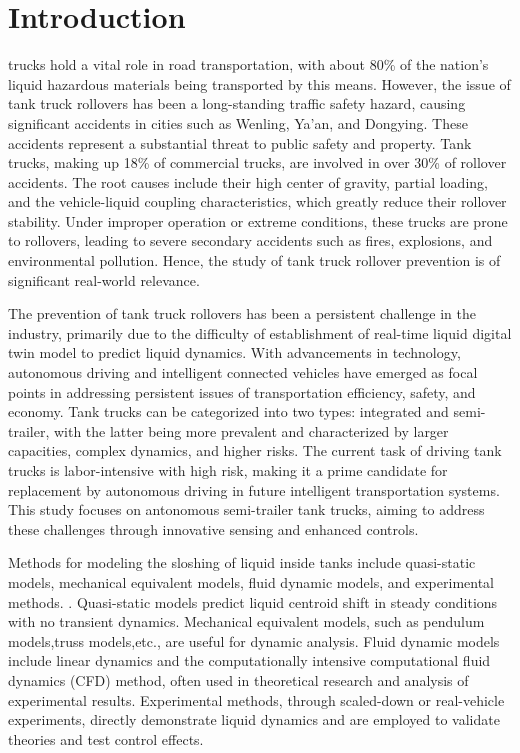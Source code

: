 \section{Introduction}
 trucks hold a vital role in road transportation, with about 80\% of the nation's liquid hazardous materials being transported by this means\cite{200Accidents}. However, the issue of tank truck rollovers has been a long-standing traffic safety hazard, causing significant accidents in cities such as Wenling, Ya'an, and Dongying\cite{WenlingAccidents}. These accidents represent a substantial threat to public safety and property. Tank trucks, making up 18\% of commercial trucks, are involved in over 30\% of rollover accidents\cite{ChinaRailway}. The root causes include their high center of gravity, partial loading\cite{GB18564-1,TSGR0005-2011}, and the vehicle-liquid coupling characteristics, which greatly reduce their rollover stability. Under improper operation or extreme conditions, these trucks are prone to rollovers, leading to severe secondary accidents such as fires, explosions, and environmental pollution. Hence, the study of tank truck rollover prevention is of significant real-world relevance.

The prevention of tank truck rollovers has been a persistent challenge in the industry, primarily due to the difficulty of establishment of real-time liquid digital twin model to predict liquid dynamics. With advancements in technology, autonomous driving and intelligent connected vehicles have emerged as focal points in addressing persistent issues of transportation efficiency, safety, and economy. Tank trucks can be categorized into two types: integrated and semi-trailer, with the latter being more prevalent and characterized by larger capacities, complex dynamics, and higher risks. The current task of driving tank trucks is labor-intensive with high risk, making it a prime candidate for replacement by autonomous driving in future intelligent transportation systems. This study focuses on antonomous semi-trailer tank trucks, aiming to address these challenges through innovative sensing and enhanced controls.

Methods for modeling the sloshing of liquid inside tanks include quasi-static models, mechanical equivalent models, fluid dynamic models, and experimental methods. \cite{JiaXinHong}. Quasi-static models predict liquid centroid shift in steady conditions with no transient dynamics\cite{HuangYang,Helieyun2020}. Mechanical equivalent models, such as pendulum models\cite{wangZhaoLin2002},truss models\cite{Matthew2022},etc., are useful for dynamic analysis. Fluid dynamic models include linear dynamics and the computationally intensive computational fluid dynamics (CFD) method, often used in theoretical research and analysis of experimental results. Experimental methods, through scaled-down or real-vehicle experiments, directly demonstrate liquid dynamics and are employed to validate theories and test control effects\cite{WangXiaorun2022,WanYing2018}. 

